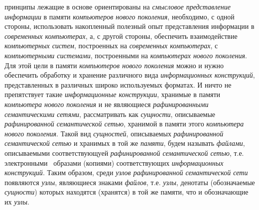 \begin{SCn}
\begin{scnsubstruct}
\begin{scnrelfromvector}{принципы лежащие в основе}
{				ориентированы на \textit{смысловое представление информации} в памяти
				\textit{компьютеров нового поколения}, необходимо, с одной стороны,
				использовать накопленный полезный опыт представления информации в
				\textit{современных компьютерах}, а, с другой стороны, обеспечить
				взаимодействие \textit{компьютерных систем}, построенных на \textit{современных
					компьютерах}, с \textit{компьютерными системами}, построенными на
				\textit{компьютерах нового поколения}. Для этой цели в памяти
				\textit{компьютеров нового поколения} можно и нужно обеспечить обработку и
				хранение различного вида \textit{информационных конструкций}, представленных в
				различных широко используемых форматах. И ничто не препятствует такие
				\textit{информационные конструкции}, хранимые в памяти \textit{компьютера
					нового поколения} и не являющиеся \textit{рафинированными семантическими
					сетями}, рассматривать как \textit{сущности}, описываемые
				\textit{рафинированной семантической сетью}, хранимой в памяти этого
				\textit{компьютера нового поколения}. Такой вид \textit{сущностей}, описываемых
				\textit{рафинированной семантической сетью} и хранимых в той же
				\textit{памяти}, будем называть \textit{файлами}, описываемыми соответствующуей
				\textit{рафинированной семантической сетью}, т.е. электронными	\ образами
				(копиями) соответствующих \textit{информационных конструкций}. Таким образом,
				среди \textit{узлов рафинированной семантической сети} появляются
				\textit{узлы}, являющиеся знаками \textit{файлов}, т.е. \textit{узлы}, денотаты
				(обозначаемые \textit{сущности}) которых находятся (хранятся) в той же памяти,
				что и обозначающие их \textit{узлы}.
				}
\end{scnrelfromvector}
\end{scnsubstruct}
\end{SCn}
